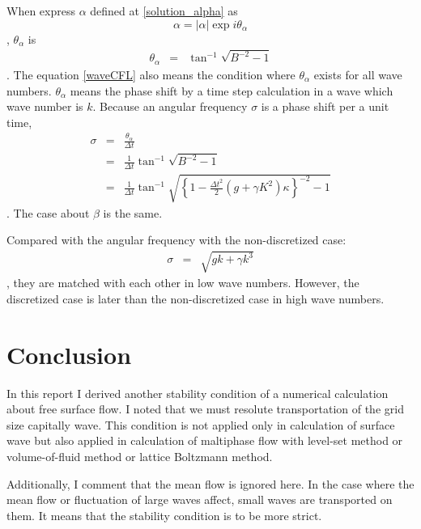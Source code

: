 \documentclass[a4paper,11pt]{article}
\begin{document}
When express $\alpha$ defined at \eqref{solution_alpha} as
\begin{equation}
\alpha = |\alpha|\exp{i\theta_\alpha}
\end{equation}
, $\theta_\alpha$ is 
\begin{eqnarray}
\theta_\alpha &=& \tan^{-1} \sqrt{B^{-2}-1}
\end{eqnarray}
. The equation \eqref{waveCFL} also means the condition where $\theta_\alpha$ exists for all wave numbers.
$\theta_\alpha$ means the phase shift by a time step calculation in a wave which wave number is $k$.
Because an angular frequency $\sigma$ is a phase shift per a unit time,
\begin{eqnarray}
\sigma &=& \frac{\theta_\alpha}{\Delta t} \\
&=& \frac{1}{\Delta t}\tan^{-1} \sqrt{B^{-2}-1} \\
&=& \frac{1}{\Delta t}\tan^{-1} \sqrt{\left\{1 - \frac{\Delta
				      t^2}{2}\left(g +\gamma K^2\right)\kappa\right\}^{-2}-1} 
\label{DescritizeAngularFrequency}
\end{eqnarray}
. The case about $\beta$ is the same.

Compared with the angular frequency with the non-discretized case: 
\begin{eqnarray}
\sigma &=&\sqrt{gk+\gamma k^3}
\end{eqnarray}
, they are matched with each other in low wave numbers.
However, the discretized case is later than the non-discretized case in high wave numbers.

\section{Conclusion}

In this report I derived another stability condition of a numerical calculation about free surface flow.
I noted that we must resolute transportation of the grid size capitally wave.
This condition is not applied only in calculation of surface wave but also applied in calculation of maltiphase flow with level-set method or volume-of-fluid method or lattice Boltzmann method.

Additionally, I comment that the mean flow is ignored here.
In the case where the mean flow or fluctuation of large waves affect, small waves are transported on them.
It means that the stability condition is to be more strict.
\end{document}
